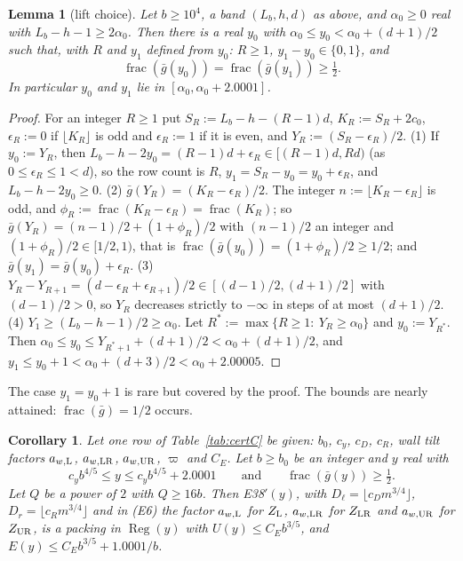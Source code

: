 \documentclass[11pt]{amsart}
\newcommand{\Reg}{\operatorname{Reg}}
\newtheorem{lemma}[theorem]{Lemma}
\newtheorem{corollary}[theorem]{Corollary}
\theoremstyle{definition}
\theoremstyle{remark}
\numberwithin{equation}{section}
\begin{document}
\begin{lemma}[lift choice]\label{lem:T2}
Let $b\ge10^4$, a band $(L_b,h,d)$ as above, and $\alpha_0\ge0$ real with $L_b-h-1\ge2\alpha_0$. Then there is a real $y_0$
with $\alpha_0\le y_0<\alpha_0+(d+1)/2$ such that, with $R$ and $y_1$ defined from $y_0$: $R\ge1$, $y_1-y_0\in\{0,1\}$, and
\[
\operatorname{frac}(\bar g(y_0))=\operatorname{frac}(\bar g(y_1))\ge\tfrac12 .
\]
In particular $y_0$ and $y_1$ lie in $[\alpha_0,\alpha_0+2.0001]$.
\end{lemma}

\begin{proof}
For an integer $R\ge1$ put $S_R:=L_b-h-(R-1)d$, $K_R:=S_R+2c_0$, $\epsilon_R:=0$ if $\lfloor K_R\rfloor$ is odd and
$\epsilon_R:=1$ if it is even, and $Y_R:=(S_R-\epsilon_R)/2$. (1) If $y_0:=Y_R$, then $L_b-h-2y_0=(R-1)d+\epsilon_R\in
[(R-1)d,Rd)$ (as $0\le\epsilon_R\le1<d$), so the row count is $R$, $y_1=S_R-y_0=y_0+\epsilon_R$, and $L_b-h-2y_0\ge0$.
(2) $\bar g(Y_R)=(K_R-\epsilon_R)/2$. The integer $n:=\lfloor K_R-\epsilon_R\rfloor$ is odd, and
$\phi_R:=\operatorname{frac}(K_R-\epsilon_R)=\operatorname{frac}(K_R)$; so $\bar g(Y_R)=(n-1)/2+(1+\phi_R)/2$ with
$(n-1)/2$ an integer and $(1+\phi_R)/2\in[1/2,1)$, that is $\operatorname{frac}(\bar g(y_0))=(1+\phi_R)/2\ge1/2$; and
$\bar g(y_1)=\bar g(y_0)+\epsilon_R$. (3) $Y_R-Y_{R+1}=(d-\epsilon_R+\epsilon_{R+1})/2\in[(d-1)/2,(d+1)/2]$ with
$(d-1)/2>0$, so $Y_R$ decreases strictly to $-\infty$ in steps of at most $(d+1)/2$. (4) $Y_1\ge(L_b-h-1)/2\ge\alpha_0$.
Let $R^*:=\max\{R\ge1:\ Y_R\ge\alpha_0\}$ and $y_0:=Y_{R^*}$. Then $\alpha_0\le y_0\le Y_{R^*+1}+(d+1)/2<\alpha_0+(d+1)/2$, and
$y_1\le y_0+1<\alpha_0+(d+3)/2<\alpha_0+2.00005$.
\end{proof}

The case $y_1=y_0+1$ is rare but covered by the proof. The bounds are nearly attained:
$\operatorname{frac}(\bar g)=1/2$ occurs.

\begin{corollary}\label{cor:b35c}
Let one row of Table~\ref{tab:certC} be given: $b_0$, $c_y$, $c_D$, $c_R$, wall tilt factors $a_{w,\rm L}$,
$a_{w,\rm LR}$, $a_{w,\rm UR}$, $\varpi$ and $C_E$. Let $b\ge b_0$ be an integer and $y$ real with
\[
c_yb^{4/5}\le y\le c_yb^{4/5}+2.0001\qquad\text{and}\qquad\operatorname{frac}(\bar g(y))\ge\tfrac12 .
\]
Let $Q$ be a power of $2$ with $Q\ge16b$. Then E38$'(y)$, with $D_\ell=\lfloor c_Dm^{3/4}\rfloor$,
$D_r=\lfloor c_Rm^{3/4}\rfloor$ and in (E6) the factor $a_{w,\rm L}$ for $Z_{\rm L}$, $a_{w,\rm LR}$ for $Z_{\rm LR}$ and
$a_{w,\rm UR}$ for $Z_{\rm UR}$, is a packing in $\Reg(y)$ with $U(y)\le C_Eb^{3/5}$, and
$E(y)\le C_Eb^{3/5}+1.0001/b$.
\end{corollary}
\end{document}
